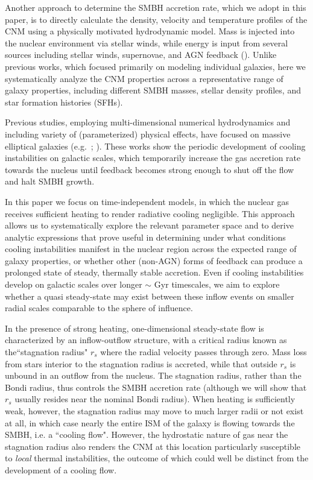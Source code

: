 \documentclass[usenatbib,fleqn]{mn2e}
\newcommand{\rs}{r_s}
\begin{document}
Another approach to determine the SMBH accretion rate, which we adopt
in this paper, is to directly calculate the density, velocity and
temperature profiles of the CNM using a physically motivated
hydrodynamic model.  Mass is injected into the nuclear environment via
stellar winds, while energy is input from several sources including
stellar winds, supernovae, and AGN feedback
(\citealt{Quataert:2004a,De-ColleGuillochon+:2012a,ShcherbakovWong+:2014a}).
Unlike previous works, which focused primarily on modeling individual
galaxies, here we systematically analyze the CNM properties across a
representative range of galaxy properties, including different SMBH
masses, stellar density profiles, and star formation histories (SFHs).

Previous studies, employing multi-dimensional numerical hydrodynamics and
including variety of (parameterized) physical effects, have focused on
massive elliptical galaxies (e.g.~\citealt{Ciotti&Ostriker07};
\citealt{Ciotti+10}).  These works show the periodic
development of cooling instabilities on galactic scales, which
temporarily increase the gas accretion rate towards the nucleus until
feedback becomes strong enough to shut off the flow and halt
SMBH growth.  

In this paper we focus on time-independent models, in which the
nuclear gas receives sufficient heating to render radiative cooling
negligible.  This approach allows us to systematically explore the
relevant parameter space and to derive analytic expressions that prove
useful in determining under what conditions cooling instabilities
manifest in the nuclear region across the expected range of galaxy
properties, or whether other (non-AGN) forms of feedback can produce a
prolonged state of steady, thermally stable accretion.  Even if
cooling instabilities develop on galactic scales over longer $\sim$
Gyr timescales, we aim to explore whether a quasi steady-state may
exist between these inflow events on smaller radial scales comparable
to the sphere of influence.


In the presence of strong heating, one-dimensional steady-state flow
is characterized by an inflow-outflow structure, with a critical
radius known as the``stagnation radius" $\rs$ where the radial
velocity passes through zero.  Mass loss from stars interior to the
stagnation radius is accreted, while that outside $\rs$ is unbound in
an outflow from the nucleus.  The stagnation radius, rather than the
Bondi radius, thus controls the SMBH accretion rate (although we will
show that $\rs$ usually resides near the nominal Bondi radius).  When
heating is sufficiently weak, however, the stagnation radius may move
to much larger radii or not exist at all, in which case nearly the
entire ISM of the galaxy is flowing towards the SMBH, i.e. a ``cooling
flow".  However, the hydrostatic nature of gas near the stagnation
radius also renders the CNM at this location particularly susceptible
to {\it local} thermal instabilities, the outcome of which could well
be distinct from the development of a cooling flow.
\end{document}
